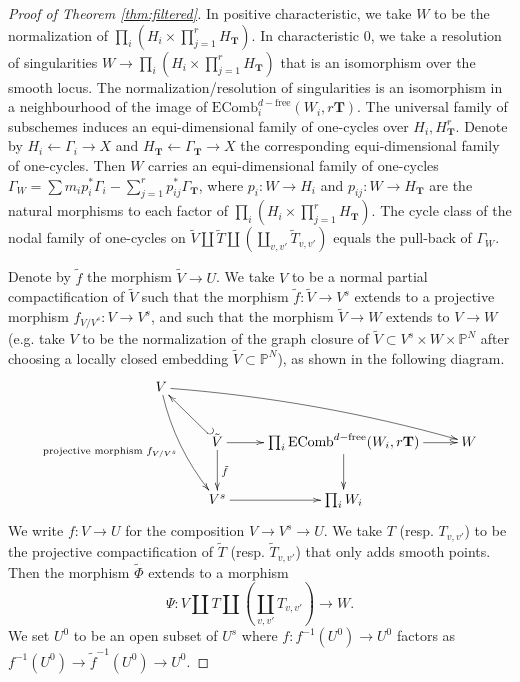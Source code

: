 \documentclass{amsart}
\theoremstyle{definition}
\theoremstyle{remark}
\newcommand{\mbb}{\mathbb}
\newcommand{\PP}{\mbb{P}}
\newcommand{\ecomb}{\text{EComb}}
\newcommand{\free}{\text{free}}
\begin{document}
\begin{proof}[Proof of Theorem \ref{thm:filtered}]
    In positive characteristic, we take $W$ to be the normalization of $\prod_i (H_i \times \prod_{j=1}^r H_\mathbf{T})$. 
    In characteristic $0$, we take a resolution of singularities $W \to \prod_i (H_i \times \prod_{j=1}^r H_\mathbf{T})$ that is an isomorphism over the smooth locus. 
    The normalization/resolution of singularities is an isomorphism in a neighbourhood of the image of $\ecomb^{d-\free}_i(W_i, r \mathbf{T})$.
 The universal family of subschemes induces an equi-dimensional family of one-cycles over $H_i, H_\mathbf{T}^r$.
    Denote by $H_i\leftarrow \Gamma_i \to X$ and $H_\mathbf{T}\leftarrow \Gamma_\mathbf{T} \to X$ the corresponding equi-dimensional family of one-cycles.
    Then $W$ carries an equi-dimensional family of one-cycles
    $\Gamma_W=\sum m_i p_i^*\Gamma_i-\sum_{j=1}^rp_{ij}^*\Gamma_\mathbf{T}$, where $p_i: W \to H_i$ and $p_{ij}: W \to H_{\mathbf{T}}$ are the natural morphisms to each factor of $\prod_i (H_i \times \prod_{j=1}^r H_\mathbf{T})$.
    The cycle class of the nodal family of one-cycles on $\tilde{V} \coprod \tilde{T} \coprod (\coprod_{v, v'} \tilde{T}_{v,v'})$ equals the pull-back of $\Gamma_W$.
    
    Denote by $\tilde{f}$ the morphism $\tilde{V} \to U$.
     We take ${V}$ to be a normal partial compactification of $\tilde{V}$ such that the morphism $\tilde{f}:\tilde{V} \to V^s$ extends to a projective morphism $f_{V/V^s}: {V} \to V^s$, and such that the morphism $\tilde{V} \to W$ extends to $V \to W$ (e.g. take $V$ to be the normalization of the graph closure of $\tilde{V} \subset V^s \times W \times \PP^N$ after choosing a locally closed embedding $\tilde{V} \subset \PP^N$), as shown in the following diagram.
     \[
     \xymatrix{
     {V} \ar@/_/[ddr]_{\text{projective morphism } f_{V/V^s}} \ar@/^/[drrr] \\
&\tilde{V} \ar[d]^{\tilde{f}} \ar[r] \ar@{_{(}->}[ul]& \prod_i \ecomb^{d-\free}(W_i, r \mathbf{T})\ar[d] \ar[r] &W \\
&V^s \ar[r] &\prod_i W_i}
     \]
     We write $f: V \to U$ for the composition $V \to V^s \to U$.
     We take ${T}$ (resp. ${T}_{v, v'}$) to be the projective compactification of $\tilde{T}$ (resp. $\tilde{T}_{v, v'}$) that only adds smooth points.
    Then the morphism $\tilde{\Phi}$ extends to a morphism
    \[
    \Psi: {V}\coprod {T}\coprod (\coprod_{v, v'}{T}_{v, v'}) \to W.
    \] 
    We set $U^0$ to be an open subset of $U^s$ where $f: f^{-1}(U^0) \to U^0$ factors as $f^{-1}(U^0)\to \tilde{f}^{-1}(U^0) \to U^0$.
\end{proof}
\end{document}
